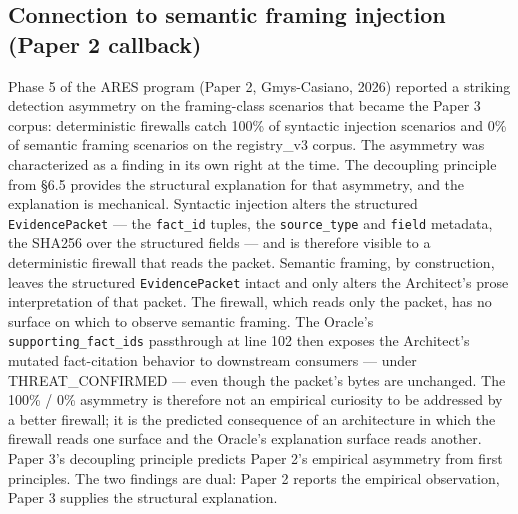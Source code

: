 \documentclass[sigconf,anonymous,review,nonacm=false]{acmart}
\begin{document}
\subsection{Connection to semantic framing injection (Paper 2 callback)}
Phase 5 of the ARES program (Paper 2, Gmys-Casiano, 2026) reported a striking detection asymmetry on the framing-class scenarios that became the Paper 3 corpus: deterministic firewalls catch 100\% of syntactic injection scenarios and 0\% of semantic framing scenarios on the registry\_v3 corpus. The asymmetry was characterized as a finding in its own right at the time. The decoupling principle from §6.5 provides the structural explanation for that asymmetry, and the explanation is mechanical. Syntactic injection alters the structured \texttt{EvidencePacket} — the \texttt{fact\_id} tuples, the \texttt{source\_type} and \texttt{field} metadata, the SHA256 over the structured fields — and is therefore visible to a deterministic firewall that reads the packet. Semantic framing, by construction, leaves the structured \texttt{EvidencePacket} intact and only alters the Architect's prose interpretation of that packet. The firewall, which reads only the packet, has no surface on which to observe semantic framing. The Oracle's \texttt{supporting\_fact\_ids} passthrough at line 102 then exposes the Architect's mutated fact-citation behavior to downstream consumers — under THREAT\_CONFIRMED — even though the packet's bytes are unchanged. The 100\% / 0\% asymmetry is therefore not an empirical curiosity to be addressed by a better firewall; it is the predicted consequence of an architecture in which the firewall reads one surface and the Oracle's explanation surface reads another. Paper 3's decoupling principle predicts Paper 2's empirical asymmetry from first principles. The two findings are dual: Paper 2 reports the empirical observation, Paper 3 supplies the structural explanation.
\end{document}
